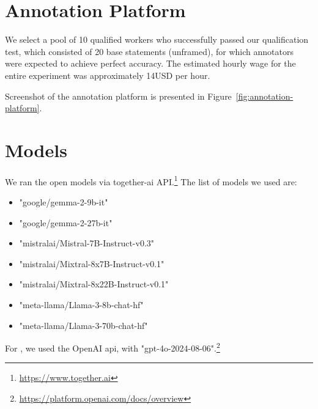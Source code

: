 \section{Annotation Platform}\label{sec:mturk-appendix}

We select a pool of 10 qualified workers who successfully passed our qualification test, which consisted of 20 base statements (unframed), for which annotators were expected to achieve perfect accuracy. The estimated hourly wage for the entire experiment was approximately 14USD per hour.

Screenshot of the annotation platform is presented in Figure~\ref{fig:annotation-platform}.



\section{Models}\label{sec:appendix-models}

We ran the open models via together-ai API.\footnote{\url{https://www.together.ai}} 
The list of models we used are:
\begin{itemize}
    \item "google/gemma-2-9b-it"
    \item "google/gemma-2-27b-it"
    \item "mistralai/Mistral-7B-Instruct-v0.3"
    \item "mistralai/Mixtral-8x7B-Instruct-v0.1"
    \item "mistralai/Mixtral-8x22B-Instruct-v0.1"
    \item "meta-llama/Llama-3-8b-chat-hf"
    \item "meta-llama/Llama-3-70b-chat-hf"
\end{itemize}

For \gpt{}, we used the OpenAI api, with "gpt-4o-2024-08-06".\footnote{\url{https://platform.openai.com/docs/overview}}






